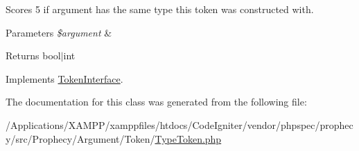 Scores 5 if argument has the same type this token was constructed with.


\begin{DoxyParams}{Parameters}
{\em \$argument} & \\
\hline
\end{DoxyParams}
\begin{DoxyReturn}{Returns}
bool$\vert$int 
\end{DoxyReturn}


Implements \mbox{\hyperlink{interface_prophecy_1_1_argument_1_1_token_1_1_token_interface_a8d5bf47ab6eaa935458d5ad160e52822}{Token\+Interface}}.



The documentation for this class was generated from the following file\+:\begin{DoxyCompactItemize}
\item 
/\+Applications/\+X\+A\+M\+P\+P/xamppfiles/htdocs/\+Code\+Igniter/vendor/phpspec/prophecy/src/\+Prophecy/\+Argument/\+Token/\mbox{\hyperlink{_type_token_8php}{Type\+Token.\+php}}\end{DoxyCompactItemize}

